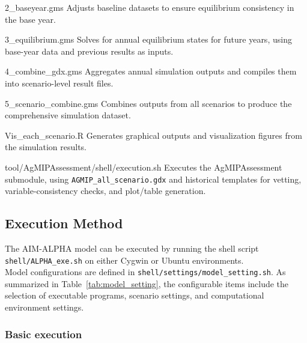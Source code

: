 \begin{programbox}{2\_baseyear.gms}
Adjusts baseline datasets to ensure equilibrium consistency in the base year.
\end{programbox}

\begin{programbox}{3\_equilibrium.gms}
Solves for annual equilibrium states for future years, using base-year data and previous results as inputs.
\end{programbox}

\begin{programbox}{4\_combine\_gdx.gms}
Aggregates annual simulation outputs and compiles them into scenario-level result files.
\end{programbox}

\begin{programbox}{5\_scenario\_combine.gms}
Combines outputs from all scenarios to produce the comprehensive simulation dataset.
\end{programbox}

\begin{programbox}{Vis\_each\_scenario.R}
Generates graphical outputs and visualization figures from the simulation results.
\end{programbox}

\begin{programbox}{tool/AgMIPAssessment/shell/execution.sh}
Executes the AgMIPAssessment submodule, using \texttt{AGMIP\_all\_scenario.gdx} and historical templates for vetting, variable-consistency checks, and plot/table generation.
\end{programbox}


\clearpage

\subsection{Execution Method}

The AIM-ALPHA model can be executed by running the shell script 
\texttt{shell/ALPHA\_exe.sh} on either Cygwin or Ubuntu environments. \\
Model configurations are defined in \texttt{shell/settings/model\_setting.sh}.  
As summarized in Table~\ref{tab:model_setting}, the configurable items include 
the selection of executable programs, scenario settings, and computational environment settings.

\subsubsection*{Basic execution}

